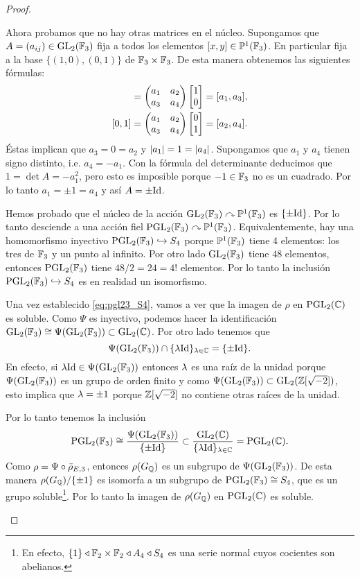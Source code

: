 \begin{proof}
\begin{enumerate}[label=\emph{\roman*})]
    \-\;\; Ahora probamos que no hay otras matrices en el núcleo. Supongamos que $A=(a_{ij})\in\mathrm{GL}_2(\mathbb{F}_3)$ fija a todos los elementos $[x,y]\in\mathbb{P}^1(\mathbb{F}_3)$. En particular fija a la base $\{(1,0),(0,1)\}$ de $\mathbb{F}_3\times\mathbb{F}_3$. De esta manera obtenemos las siguientes fórmulas:
    \begin{align*}
			[1,0]=\mat{a_1}{a_2}{a_3}{a_4}\begin{bmatrix}1\\0\end{bmatrix}=[a_1,a_3],\\
			[0,1]=\mat{a_1}{a_2}{a_3}{a_4}\begin{bmatrix}0\\1\end{bmatrix}=[a_2,a_4].
    \end{align*}
    Éstas implican que $a_3=0=a_2$ y $\left| a_1 \right|=1=\left| a_4 \right|$. Supongamos que $a_1$ y $a_4$ tienen signo distinto, i.e. $a_4=-a_1$. Con la fórmula del determinante deducimos que $1=\det A=-a_1^2$, pero esto es imposible porque $-1\in\mathbb{F}_3$ no es un cuadrado. Por lo tanto $a_1=\pm1=a_4$ y as\'i $A=\pm\mathrm{Id}$.
    
    \-\;\; Hemos probado que el núcleo de la acción $\mathrm{GL}_2(\mathbb{F}_3)\curvearrowright\mathbb{P}^1(\mathbb{F}_3)$ es $\{\pm\mathrm{Id}\}$. Por lo tanto desciende a una acción fiel $\mathrm{PGL}_2(\mathbb{F}_3)\curvearrowright\mathbb{P}^1(\mathbb{F}_3)$. Equivalentemente, hay una homomorfismo inyectivo $\mathrm{PGL}_2(\mathbb{F}_3)\hookrightarrow S_4$ porque $\mathbb{P}^1(\mathbb{F}_3)$ tiene 4 elementos: los tres de $\mathbb{F}_3$ y un punto al infinito. Por otro lado $\mathrm{GL}_2(\mathbb{F}_3)$ tiene $48$ elementos, entonces $\mathrm{PGL}_2(\mathbb{F}_3)$ tiene $48/2=24=4!$ elementos. Por lo tanto la inclusión $\mathrm{PGL}_2(\mathbb{F}_3)\hookrightarrow S_4$ es en realidad un isomorfismo.

    \-\;\; Una vez establecido \eqref{eq:pgl23_S4}, vamos a ver que la imagen de $\rho$ en $\mathrm{PGL}_2(\mathbb{C})$ es soluble. Como $\Psi$ es inyectivo, podemos hacer la identificación $\mathrm{GL}_2(\mathbb{F}_3)\cong\Psi(\mathrm{GL}_2(\mathbb{F}_3))\subset\mathrm{GL}_2(\mathbb{C})$. Por otro lado tenemos que
    \[
      \Psi(\mathrm{GL}_2(\mathbb{F}_3))\cap\{\lambda\mathrm{Id}\}_{\lambda\in\mathbb{C}}=\{\pm\mathrm{Id}\}.
    \]
    En efecto, si $\lambda\mathrm{Id}\in\Psi(\mathrm{GL}_2(\mathbb{F}_3))$ entonces $\lambda$ es una ra\'iz de la unidad porque $\Psi(\mathrm{GL}_2(\mathbb{F}_3))$ es un grupo de orden finito y como $\Psi(\mathrm{GL}_2(\mathbb{F}_3))\subset\mathrm{GL}_2(\mathbb{Z}[\sqrt{-2}])$, esto implica que $\lambda=\pm1$ porque $\mathbb{Z}[\sqrt{-2}]$ no contiene otras raíces de la unidad.

    \-\;\; Por lo tanto tenemos la inclusión
\[
	\mathrm{PGL}_2(\mathbb{F}_3)\cong\frac{\Psi(\mathrm{GL}_2(\mathbb{F}_3))}{\{\pm\mathrm{Id}\}}\subset\frac{\mathrm{GL}_2(\mathbb{C})}{\{\lambda\mathrm{Id}\}_{\lambda\in\mathbb{C}}}=\mathrm{PGL}_2(\mathbb{C}).
\]
Como $\rho=\Psi\circ\bar{\rho}_{E,3}$, entonces $\rho(G_{\mathbb{Q}})$ es un subgrupo de $\Psi(\mathrm{GL}_2(\mathbb{F}_3))$. De esta manera $\rho(G_{\mathbb{Q}})/\{\pm1\}$ es isomorfa a un subgrupo de $\mathrm{PGL}_2(\mathbb{F}_3)\cong S_4$, que es un grupo soluble\footnote{En efecto, $\{1\}\triangleleft \mathbb{F}_2\times\mathbb{F}_2 \triangleleft A_4 \triangleleft S_4$ es una serie normal cuyos cocientes son abelianos.}. Por lo tanto la imagen de $\rho(G_{\mathbb{Q}})$ en $\mathrm{PGL}_2(\mathbb{C})$ es soluble.


\end{enumerate}
\end{proof}
